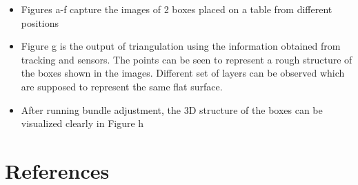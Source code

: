 \documentclass{article}
\begin{document}
\begin{enumerate}
\begin{figure}[H]
			\end{figure}
					\begin{itemize}
						\item Figures a-f capture the images of 2 boxes placed on a table from different positions
						\item Figure g is the output of triangulation using the information obtained from tracking and sensors. The points can be seen to represent a rough structure of the boxes shown in the images. Different set of layers can be observed which are supposed to represent the same flat surface.
						\item After running bundle adjustment, the 3D structure of the boxes can be visualized clearly in Figure h 
					\end{itemize}	
			\end{enumerate}
	\section{References}
\end{document}
